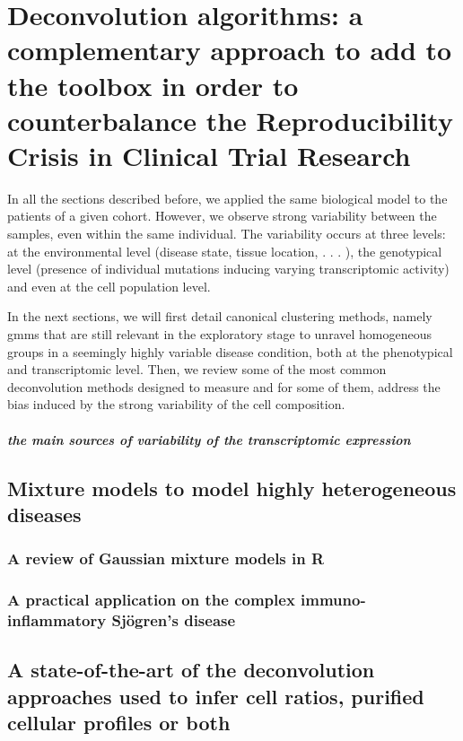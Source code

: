 \chapter{Deconvolution algorithms: a complementary approach to add to the toolbox in order to counterbalance the Reproducibility Crisis in Clinical Trial Research}

In all the sections described before, we applied the same biological model to the patients of a given cohort. However, we observe strong variability between the samples, even within the same individual. The variability occurs at three levels: at the environmental level (disease state, tissue location, . . . ), the genotypical level (presence of individual mutations inducing varying transcriptomic activity) and even at the cell population level. 

In the next sections, we will first detail canonical clustering methods, namely \Glspl{gmm} that are still relevant in the exploratory stage to unravel homogeneous groups in a seemingly highly variable disease condition, both at the phenotypical and transcriptomic level. Then, we review some of the most common deconvolution methods designed to measure and for some of them, address the bias induced by the strong variability of the cell composition.

\paragraph{the main sources of variability of the transcriptomic expression}

\section{Mixture models to model highly heterogeneous diseases} 

\subsection{A review of Gaussian mixture models in R}

\subsection{A practical application on the complex immuno-inflammatory Sjögren's disease}


\section{A state-of-the-art of the deconvolution approaches used to infer cell ratios, purified cellular profiles or both}

